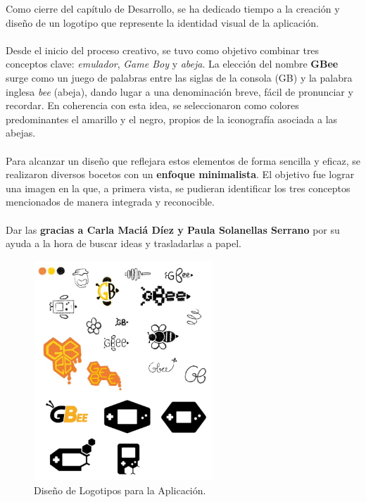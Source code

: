 Como cierre del capítulo de Desarrollo, se ha dedicado tiempo a la creación y diseño de un logotipo que represente la identidad visual de la aplicación.
\\\\
Desde el inicio del proceso creativo, se tuvo como objetivo combinar tres conceptos clave: \textit{emulador}, \textit{Game Boy} y \textit{abeja}. La elección del nombre \textbf{GBee} surge como un juego de palabras entre las siglas de la consola (GB) y la palabra inglesa \textit{bee} (abeja), dando lugar a una denominación breve, fácil de pronunciar y recordar. En coherencia con esta idea, se seleccionaron como colores predominantes el amarillo y el negro, propios de la iconografía asociada a las abejas.
\\\\
Para alcanzar un diseño que reflejara estos elementos de forma sencilla y eficaz, se realizaron diversos bocetos con un \textbf{enfoque minimalista}. El objetivo fue lograr una imagen en la que, a primera vista, se pudieran identificar los tres conceptos mencionados de manera integrada y reconocible.
\\\\
Dar las \textbf{gracias a Carla Maciá Díez y Paula Solanellas Serrano} por su ayuda a la hora de buscar ideas y trasladarlas a papel.

\begin{figure}[H]
    \centering
    \includegraphics[width=0.6\textwidth]{include/images/logo_sketches.png}
    \caption{Diseño de Logotipos para la Aplicación.}\label{figure:logosketches}
\end{figure}

